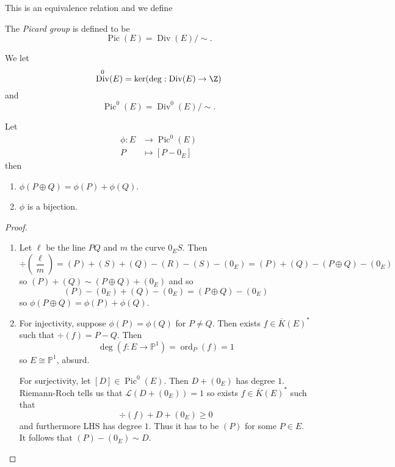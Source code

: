 \documentclass[a4paper]{article}
\theoremstyle{definition}
\renewcommand*{\P}{\mathbb{P}}
\DeclareMathOperator{\ord}{ord}
\DeclareMathOperator{\Div}{Div} %
\DeclareMathOperator{\Pic}{Pic} %
\begin{document}
This is an equivalence relation and we define

\begin{definition}
  The \emph{Picard group} is defined to be
  \[
    \Pic(E) = \Div (E)/\sim.
  \]
\end{definition}

\begin{definition}
  We let
  \[
    \Div^0(E) = \ker (\deg: \Div(E) \to \Z)
  \]
  and
  \[
    \Pic^0(E) = \Div^0(E)/\sim.
  \]
\end{definition}

\begin{proposition}
  Let
  \begin{align*}
    \phi: E &\to \Pic^0(E) \\
    P &\mapsto [P - 0_E]
  \end{align*}
  then
  \begin{enumerate}
  \item \(\phi(P \oplus Q) = \phi(P) + \phi(Q)\).
  \item \(\phi\) is a bijection.
  \end{enumerate}
\end{proposition}

\begin{proof}\leavevmode
  \begin{enumerate}
  \item Let \(\ell\) be the line \(PQ\) and \(m\) the curve \(0_ES\). Then
    \[
      \div (\frac{\ell}{m})
      = (P) + (S) + (Q) - (R) - (S) - (0_E)
      = (P) + (Q) - (P \oplus Q) - (0_E)
    \]
    so \((P) + (Q) \sim (P \oplus Q) + (0_E)\) and so
    \[
      (P) - (0_E) + (Q) - (0_E) = (P \oplus Q) - (0_E)
    \]
    so \(\phi(P \oplus Q) = \phi(P) + \phi(Q)\).
  \item For injectivity, suppose \(\phi(P) = \phi(Q)\) for \(P \neq Q\). Then exists \(f \in \overline K(E)^*\) such that \(\div (f) = P - Q\). Then
    \[
      \deg (f: E \to \P^1) = \ord_P(f) = 1
    \]
    so \(E \cong \P^1\), absurd.

    For surjectivity, let \([D] \in \Pic^0(E)\). Then \(D + (0_E)\) has degree \(1\). Riemann-Roch tells us that \(\mathcal L(D + (0_E)) = 1\) so exists \(f \in \overline K(E)^*\) such that
    \[
      \div(f) + D + (0_E) \geq 0
    \]
    and furthermore LHS has degree \(1\). Thus it has to be \((P)\) for some \(P \in E\). It follows that \((P) - (0_E) \sim D\).
  \end{enumerate}
\end{proof}
\end{document}
